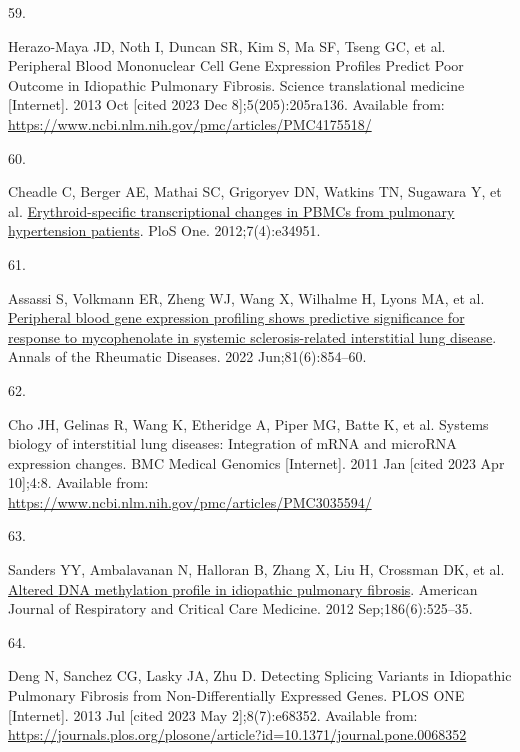 \documentclass[
]{article}
\newlength{\cslhangindent}
\newlength{\csllabelwidth}
\newenvironment{CSLReferences}[2] %
 {\begin{list}{}{%
  \setlength{\itemindent}{0pt}
  \setlength{\leftmargin}{0pt}
  \setlength{\parsep}{0pt}
  \ifodd #1
   \setlength{\leftmargin}{\cslhangindent}
   \setlength{\itemindent}{-1\cslhangindent}
  \fi
  \setlength{\itemsep}{#2\baselineskip}}}
 {\end{list}}
\newcommand{\CSLLeftMargin}[1]{\parbox[t]{\csllabelwidth}{\strut#1\strut}}
\newcommand{\CSLRightInline}[1]{\parbox[t]{\linewidth - \csllabelwidth}{\strut#1\strut}}
\begin{document}
\begin{CSLReferences}{0}{1}
\CSLLeftMargin{59. }%
\CSLRightInline{Herazo-Maya JD, Noth I, Duncan SR, Kim S, Ma SF, Tseng GC, et al. Peripheral {Blood} {Mononuclear} {Cell} {Gene} {Expression} {Profiles} {Predict} {Poor} {Outcome} in {Idiopathic} {Pulmonary} {Fibrosis}. Science translational medicine {[}Internet{]}. 2013 Oct {[}cited 2023 Dec 8{]};5(205):205ra136. Available from: \url{https://www.ncbi.nlm.nih.gov/pmc/articles/PMC4175518/}}

\CSLLeftMargin{60. }%
\CSLRightInline{Cheadle C, Berger AE, Mathai SC, Grigoryev DN, Watkins TN, Sugawara Y, et al. \href{https://doi.org/10.1371/journal.pone.0034951}{Erythroid-specific transcriptional changes in {PBMCs} from pulmonary hypertension patients}. PloS One. 2012;7(4):e34951. }

\CSLLeftMargin{61. }%
\CSLRightInline{Assassi S, Volkmann ER, Zheng WJ, Wang X, Wilhalme H, Lyons MA, et al. \href{https://doi.org/10.1136/annrheumdis-2021-221313}{Peripheral blood gene expression profiling shows predictive significance for response to mycophenolate in systemic sclerosis-related interstitial lung disease}. Annals of the Rheumatic Diseases. 2022 Jun;81(6):854--60. }

\CSLLeftMargin{62. }%
\CSLRightInline{Cho JH, Gelinas R, Wang K, Etheridge A, Piper MG, Batte K, et al. Systems biology of interstitial lung diseases: Integration of {mRNA} and {microRNA} expression changes. BMC Medical Genomics {[}Internet{]}. 2011 Jan {[}cited 2023 Apr 10{]};4:8. Available from: \url{https://www.ncbi.nlm.nih.gov/pmc/articles/PMC3035594/}}

\CSLLeftMargin{63. }%
\CSLRightInline{Sanders YY, Ambalavanan N, Halloran B, Zhang X, Liu H, Crossman DK, et al. \href{https://doi.org/10.1164/rccm.201201-0077OC}{Altered {DNA} methylation profile in idiopathic pulmonary fibrosis}. American Journal of Respiratory and Critical Care Medicine. 2012 Sep;186(6):525--35. }

\CSLLeftMargin{64. }%
\CSLRightInline{Deng N, Sanchez CG, Lasky JA, Zhu D. Detecting {Splicing} {Variants} in {Idiopathic} {Pulmonary} {Fibrosis} from {Non}-{Differentially} {Expressed} {Genes}. PLOS ONE {[}Internet{]}. 2013 Jul {[}cited 2023 May 2{]};8(7):e68352. Available from: \url{https://journals.plos.org/plosone/article?id=10.1371/journal.pone.0068352}}


\end{CSLReferences}
\end{document}
